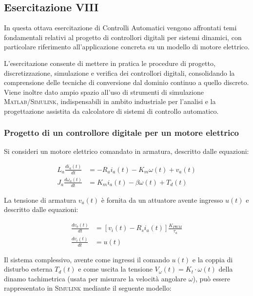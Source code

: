 \documentclass[../main.tex]{subfiles}
\begin{document}
\clearpage
\thispagestyle{empty}
\subsection{Esercitazione VIII}

In questa ottava esercitazione di Controlli Automatici vengono affrontati temi fondamentali relativi al progetto di controllori digitali per sistemi dinamici, con particolare riferimento all’applicazione concreta su un modello di motore elettrico.

L’esercitazione consente di mettere in pratica le procedure di progetto, discretizzazione, simulazione e verifica dei controllori digitali, consolidando la comprensione delle tecniche di conversione dal dominio continuo a quello discreto. Viene inoltre dato ampio spazio all’uso di strumenti di simulazione \textsc{Matlab}/\textsc{Simulink}, indispensabili in ambito industriale per l’analisi e la progettazione assistita da calcolatore di sistemi di controllo automatico.

\vspace*{1cm}

\subsubsection{Progetto di un controllore digitale per un motore elettrico}
\label{progetto1}

Si consideri un motore elettrico comandato in armatura, descritto dalle equazioni:


\begin{equation}
\begin{split}
	L_a \frac{di_a(t)}{dt} &= -R_ai_a(t) -K_m\omega(t) + v_a(t) \\
	J_a \frac{d \omega _a(t)}{dt} &= K_mi_a(t) - \beta \omega(t) + T_d(t) 
\end{split}
\end{equation}


La tensione di armatura $v_a(t)$ è fornita da un attuatore avente ingresso $u(t)$ e descritto dalle equazioni:


\begin{equation}
\begin{split}
	\frac{dv_a(t)}{dt} &= [v_i(t) - R_si_a(t)] \frac{K_{PWM}}{\tau _a} \\
	\frac{dv_i(t)}{dt} &= u(t)	
\end{split}	
\end{equation}


Il sistema complessivo, avente come ingressi il comando $u(t)$ e la coppia di disturbo esterna $T_d(t)$ e come uscita la tensione $V_\omega(t) = K_t \cdot \omega(t)$ della dinamo tachimetrica (usata per misurare la velocità angolare $\omega$), può essere rappresentato in \textsc{Simulink} mediante il seguente modello:\\
\end{document}
